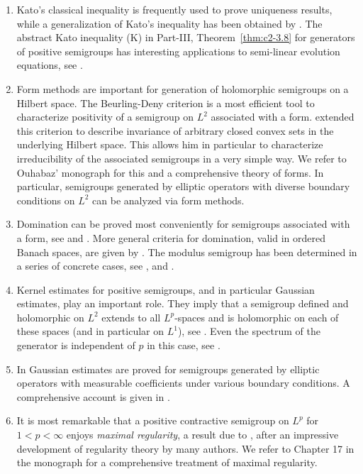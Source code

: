 \begin{enumerate}
\item
Kato's classical inequality is frequently used to prove uniqueness results, while a generalization of Kato's inequality has been obtained by \textcite{zbmath02093937}. 
The abstract Kato inequality (K) in Part-III, Theorem~\ref{thm:c2-3.8} for generators of positive semigroups has interesting applications to semi-linear evolution equations, see \textcite{zbmath07978278}.


\item 
Form  methods are important for generation of holomorphic semigroups on a Hil\-bert space.
The Beurling-Deny criterion is a most efficient tool to characterize positivity of a semigroup on $L^{2}$ associated with a form. 
\textcite{zbmath00001168} extended this criterion to describe invariance of arbitrary closed convex sets in the underlying Hilbert space. This allows him in particular to characterize irreducibility of the associated semigroups in a very simple way. 
We refer to Ouhabaz' monograph \textcite{zbmath02168554} for this and a comprehensive theory of forms. 
In particular, semigroups generated by elliptic operators with diverse boundary conditions on $L^{2}$ can be analyzed via form methods. 

\item 
Domination can be proved most conveniently for semigroups associated with a form, see \eg \textcite{zbmath05059635} and \textcite{zbmath02168554}. 
More general criteria for domination, valid in ordered Banach spaces, are given by \textcite{zbmath05119932}.
The modulus semigroup has been determined in a series of concrete cases, see \textcite{zbmath05262326}, \textcite{zbmath02106405} and \textcite{zbmath02167818}.

\item 
Kernel estimates for positive semigroups, and in particular Gaussian estimates, play an important role. 
They imply that a semigroup defined and holomorphic on $L^{2}$ extends to all $L^{p}$-spaces and is holomorphic on each of these spaces (and in particular on $L^{1}$), see \textcite{zbmath00788452}. 
Even the spectrum of the generator is independent of $p$ in this case, see \textcite{zbmath01344331}. 

\item
In \textcite{zbmath01538134} Gaussian estimates are proved for semigroups generated by elliptic operators with measurable coefficients under various boundary conditions. A comprehensive account is given in \textcite{zbmath02168554}.


\item 
It is most remarkable that a positive contractive semigroup on $L^{p}$ for  
\mbox{$1 < p < \infty$}  enjoys \emph{maximal regularity}, a result due to  \textcite{zbmath01661089}, after an impressive development of regularity theory by many authors.
We refer to Chapter 17 in the monograph \textcite{zbmath07784626} for a comprehensive treatment of maximal regularity. 


\end{enumerate}
